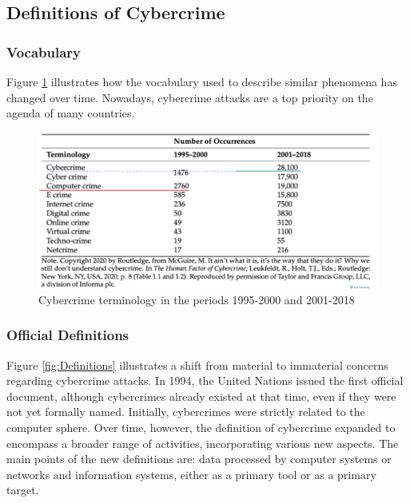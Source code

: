 \subsection{Definitions of Cybercrime}
\subsubsection{Vocabulary}
Figure \ref{fig:Vocabulary1} illustrates how the vocabulary used to describe similar phenomena has changed over time. Nowadays, cybercrime attacks are a top priority on the agenda of many countries.
\begin{figure}[H]
    \includegraphics[width=\linewidth]{Images/Sociology/Vocabulary1.png}
    \caption{Cybercrime terminology in the periods 1995-2000 and 2001-2018}
    \label{fig:Vocabulary1}
\end{figure}

\subsubsection{Official Definitions}
Figure \ref{fig:Definitions} illustrates a shift from material to immaterial concerns regarding cybercrime attacks. In 1994, the United Nations issued the first official document, although cybercrimes already existed at that time, even if they were not yet formally named. Initially, cybercrimes were strictly related to the computer sphere. Over time, however, the definition of cybercrime expanded to encompass a broader range of activities, incorporating various new aspects. The main points of the new definitions are: data processed by computer systems or networks and information systems, either as a primary tool or as a primary target.

